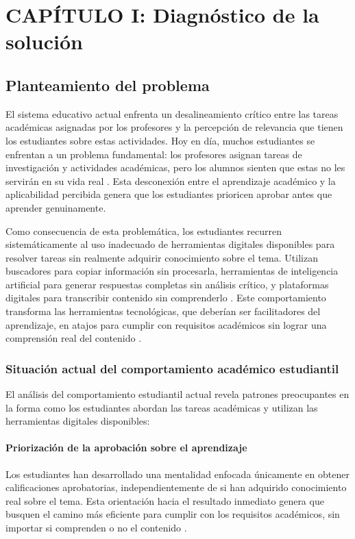 \section{CAPÍTULO I: Diagnóstico de la solución}

\subsection{Planteamiento del problema}

El sistema educativo actual enfrenta un desalineamiento crítico entre las tareas académicas asignadas por los profesores y la percepción de relevancia que tienen los estudiantes sobre estas actividades. Hoy en día, muchos estudiantes se enfrentan a un problema fundamental: los profesores asignan tareas de investigación y actividades académicas, pero los alumnos sienten que estas no les servirán en su vida real \cite{deci2017}. Esta desconexión entre el aprendizaje académico y la aplicabilidad percibida genera que los estudiantes prioricen aprobar antes que aprender genuinamente.

Como consecuencia de esta problemática, los estudiantes recurren sistemáticamente al uso inadecuado de herramientas digitales disponibles para resolver tareas sin realmente adquirir conocimiento sobre el tema. Utilizan buscadores para copiar información sin procesarla, herramientas de inteligencia artificial para generar respuestas completas sin análisis crítico, y plataformas digitales para transcribir contenido sin comprenderlo \cite{martinez2023}. Este comportamiento transforma las herramientas tecnológicas, que deberían ser facilitadores del aprendizaje, en atajos para cumplir con requisitos académicos sin lograr una comprensión real del contenido \cite{chen2023}.

\subsubsection{Situación actual del comportamiento académico estudiantil}

El análisis del comportamiento estudiantil actual revela patrones preocupantes en la forma como los estudiantes abordan las tareas académicas y utilizan las herramientas digitales disponibles:

\paragraph{Priorización de la aprobación sobre el aprendizaje}
Los estudiantes han desarrollado una mentalidad enfocada únicamente en obtener calificaciones aprobatorias, independientemente de si han adquirido conocimiento real sobre el tema. Esta orientación hacia el resultado inmediato genera que busquen el camino más eficiente para cumplir con los requisitos académicos, sin importar si comprenden o no el contenido \cite{sappaile2024}.

